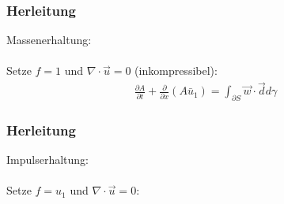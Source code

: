 \begin{frame}\frametitle{Herleitung}
Massenerhaltung:\\~\\
Setze $f=1$ und $\nabla \cdot \vec u = 0$ (inkompressibel):
\begin{align}
  \frac{\partial A}{\partial t} + \frac{\partial}{\partial x} (A \bar u_1) = \int_{\partial S} \vec w \cdot \vec d d\gamma %
\end{align}
\end{frame}

\begin{frame}\frametitle{Herleitung}
  Impulserhaltung:\\~\\
  Setze $f=u_1$ und $\nabla \cdot \vec u = 0$:
\end{frame}
